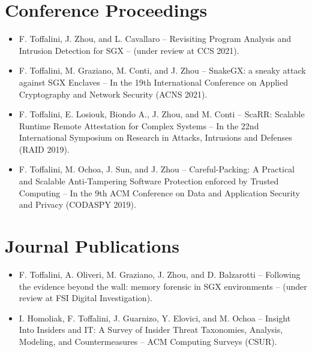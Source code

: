 \documentclass[
11pt, %
oneside, %
english, %
singlespacing, %
headsepline, %
]{MastersDoctoralThesis} %
\begin{document}
\begin{publications}
\addchaptertocentry{\publicationsname} %

\section*{Conference Proceedings}
\begin{itemize}
	
	\item F. Toffalini, J. Zhou, and L. Cavallaro -- Revisiting Program 
	Analysis and Intrusion Detection for SGX -- (under review at CCS 2021).
	
	\item F. Toffalini, M. Graziano, M. Conti, and J. Zhou -- SnakeGX: a sneaky 
	attack against SGX Enclaves -- In the 19th International Conference on 
	Applied Cryptography and Network Security (ACNS 2021).
	
	\item F. Toffalini, E. Losiouk, Biondo A., J. Zhou, and M. Conti -- ScaRR: 
	Scalable Runtime Remote Attestation for Complex Systems -- In the 22nd 
	International Symposium on Research in Attacks, Intrusions and Defenses 
	(RAID 2019).
	
	\item F. Toffalini, M. Ochoa, J. Sun, and J. Zhou -- Careful-Packing: A 
	Practical and Scalable Anti-Tampering Software Protection enforced by 
	Trusted Computing -- In the 9th ACM Conference on Data and Application 
	Security and Privacy (CODASPY 2019).
	
\end{itemize}

\section*{Journal Publications}
\begin{itemize}
	\item F. Toffalini, A. Oliveri, M. Graziano, J. Zhou, and D. Balzarotti -- 
	Following the evidence beyond the wall:	memory forensic in SGX 
	environments -- (under review at FSI Digital Investigation).
	
	\item I. Homoliak, F. Toffalini, J. Guarnizo, Y. Elovici, and M. 
	Ochoa -- Insight Into Insiders and IT: A Survey of Insider Threat 
	Taxonomies, Analysis, Modeling, and Countermeasures -- ACM Computing 
	Surveys (CSUR).
	
\end{itemize}


\end{publications}
\end{document}
